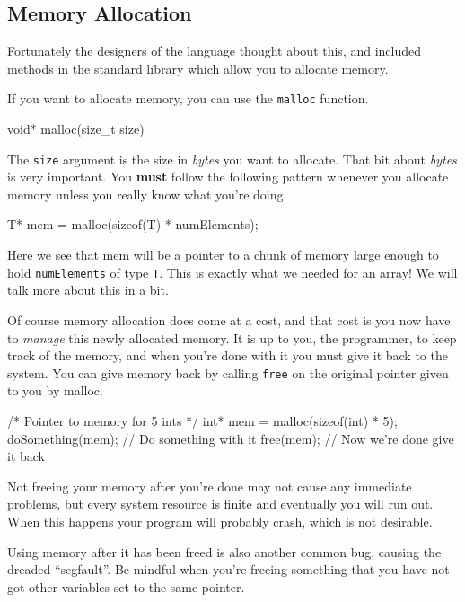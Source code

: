 \subsection{Memory Allocation}

Fortunately the designers of the language thought about this, and included methods in the standard library which allow you to allocate memory.

If you want to allocate memory, you can use the \texttt{malloc} function. 

\begin{codeinline}
void* malloc(size_t size)
\end{codeinline}

The \texttt{size} argument is the size in \emph{bytes} you want to allocate.
That bit about \emph{bytes} is very important.
You \textbf{must} follow the following pattern whenever you allocate memory unless you really know what you're doing.

\begin{codeinline}
T* mem = malloc(sizeof(T) * numElements);
\end{codeinline}

Here we see that mem will be a pointer to a chunk of memory large enough to hold \texttt{numElements} of type \texttt{T}.
This is exactly what we needed for an array!
We will talk more about this in a bit.

Of course memory allocation does come at a cost, and that cost is you now have to \emph{manage} this newly allocated memory.
It is up to you, the programmer, to keep track of the memory, and when you're done with it you must give it back to the system.
You can give memory back by calling \texttt{free} on the original pointer given to you by malloc.

\begin{codeblock}
/* Pointer to memory for 5 ints */
int* mem = malloc(sizeof(int) * 5);
doSomething(mem); // Do something with it
free(mem); // Now we're done give it back
\end{codeblock}

Not freeing your memory after you're done may not cause any immediate problems, but every system resource is finite and eventually you will run out.
When this happens your program will probably crash, which is not desirable.

Using memory after it has been freed is also another common bug, causing the dreaded ``segfault''.
Be mindful when you're freeing something that you have not got other variables set to the same pointer.

